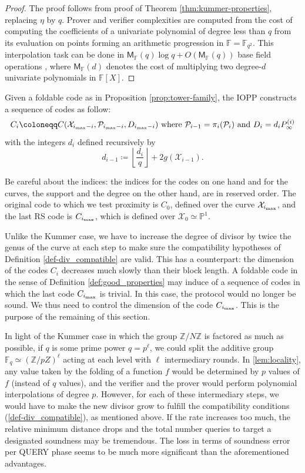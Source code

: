 \documentclass[10pt,a4paper]{article}
\newcommand\F{\mathbb{F}}
\newcommand\Fq{\mathbb{F}_q}
\newcommand\PP{\mathbb{P}}
\newcommand\Z{\mathbb{Z}}
\newcommand\floor[1]{\left\lfloor #1 \right\rfloor}
\newcommand\calX{\mathcal{X}}
\newcommand\calP{\mathcal{P}}
\newcommand\mydef{\coloneqq}
\newcommand{\ii}{i_{\rm{max}}}
\theoremstyle{plain}
\theoremstyle{plain}
\theoremstyle{definition}
\theoremstyle{remark}
\theoremstyle{plain}
\begin{document}
\begin{proof}
	The proof follows from proof of Theorem \ref{thm:kummer-properties}, replacing $\eta$ by $q$. Prover and verifier complexities are computed from the cost of computing the coefficients of a univariate polynomial of degree less than $q$ from its evaluation on points forming an arithmetic progression in $\F = \F_{q^2}$. This interpolation task can be done in $\mathsf{M}_\F(q)\log q + O(\mathsf{M}_\F(q))$ base field operations \cite{BrS05}, where $\mathsf{M}_\F(d)$ denotes the cost of multiplying two degree-$d$ univariate polynomials in $\F[X]$.
\end{proof}




Given a foldable code as in Proposition \ref{prop:tower-family}, the IOPP constructs a sequence of codes as follow:
\[C_i \mydef C(\calX_{\ii-i},\calP_{\ii-i},D_{\ii-i}) \text{ where } \calP_{i-1}=\pi_i(\calP_i)\text{ and } D_i = d_iP^{(i)}_{\infty} \]
with the integers $d_i$ defined recursively by
\[
d_{i-1} \mydef \floor{ \dfrac{d_i}{q}} + 2g(\calX_{i-1}).
\]
\begin{remark}
	Be careful about the indices: the indices for the codes on one hand and for the curves, the support and the degree on the other hand, are in reserved order. The original code to which we test proximity is $C_0$, defined over the curve $\calX_{\ii}$, and the last RS code is $C_{\ii}$, which is defined over $\calX_0\simeq \PP^1$.
\end{remark}

Unlike the Kummer case, we have to increase the degree of divisor by twice the genus of the curve at each step to make sure the compatibility hypotheses of Definition \ref{def-div_compatible} are valid. This has a counterpart: the dimension of the codes $C_i$ decreases much slowly than their block length. A foldable code in the sense of Definition \ref{def:good_properties} may induce of a sequence of codes in which the last code $C_{\ii}$ is trivial. In this case, the protocol would no longer be sound. We thus need to control the dimension of the code $C_{\ii}$. This is the purpose of the remaining of this section.

\begin{remark}
	In light of the Kummer case in which the group $\Z/N\Z$ is factored as much as possible, if $q$ is some prime power $q=p^\ell$, we could split the additive group $\Fq \simeq \left(\Z/pZ\right)^\ell$ acting at each level with $\ell$ intermediary rounds. In \ref{lem:locality}, any value taken by the folding of a function $f$ would be determined by $p$ values of $f$ (instead of $q$ values), and the verifier and the prover would perform polynomial interpolations of degree $p$. However, for each of these intermediary steps, we would have to make the new divisor grow to fulfill the compatibility conditions (\autoref{def-div_compatible}), as mentioned above. If the rate increases too much, the relative minimum distance drops and the total number queries to target a designated soundness may be tremendous. The loss in terms of soundness error per \textsf{QUERY} phase seems to be much more significant than the aforementioned advantages. 
\end{remark}
\end{document}
